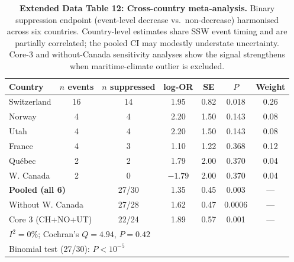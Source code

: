 \documentclass[11pt,letterpaper]{article}
\begin{document}
\begin{table}[!ht]
\centering
\caption{\textbf{Extended Data Table 12: Cross-country meta-analysis.}
Binary suppression endpoint (event-level decrease vs.\ non-decrease) harmonised across six countries. Country-level estimates share SSW event timing and are partially correlated; the pooled CI may modestly understate uncertainty. Core-3 and without-Canada sensitivity analyses show the signal strengthens when maritime-climate outlier is excluded.}
\label{tab:meta_forest}
\small
\begin{tabular}{lcccccc}
\toprule
Country & $n$ events & $n$ suppressed & log-OR & SE & $P$ & Weight \\
\midrule
Switzerland & 16 & 14 & 1.95 & 0.82 & 0.018 & 0.26 \\
Norway & 4 & 4 & 2.20 & 1.50 & 0.143 & 0.08 \\
Utah & 4 & 4 & 2.20 & 1.50 & 0.143 & 0.08 \\
France & 4 & 3 & 1.10 & 1.22 & 0.368 & 0.12 \\
Qu\'ebec & 2 & 2 & 1.79 & 2.00 & 0.370 & 0.04 \\
W. Canada & 2 & 0 & $-1.79$ & 2.00 & 0.370 & 0.04 \\
\midrule
\multicolumn{2}{l}{\textbf{Pooled (all 6)}} & 27/30 & 1.35 & 0.45 & 0.003 & --- \\
\multicolumn{2}{l}{Without W. Canada} & 27/28 & 1.62 & 0.47 & 0.0006 & --- \\
\multicolumn{2}{l}{Core 3 (CH+NO+UT)} & 22/24 & 1.89 & 0.57 & 0.001 & --- \\
\midrule
\multicolumn{5}{l}{$I^2 = 0\%$; Cochran's $Q = 4.94$, $P = 0.42$} & & \\
\multicolumn{5}{l}{Binomial test (27/30): $P < 10^{-5}$} & & \\
\bottomrule
\end{tabular}
\end{table}
\end{document}
